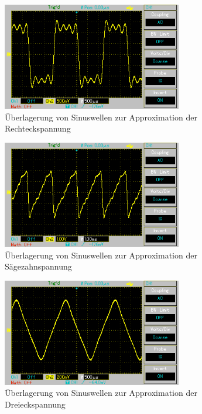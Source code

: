 \begin{figure}[H]
 \includegraphics[width = 0.7\textwidth]{pics/rechteck.png}
 \caption{Überlagerung von Sinuswellen zur Approximation der Rechteckspannung}
 \label{pic_rechteckoszi}
\end{figure}
\begin{figure}[H]
 \includegraphics[width = 0.7\textwidth]{pics/saegezahn.png}
 \caption{Überlagerung von Sinuswellen zur Approximation der Sägezahnspannung}
 \label{pic_saegzahnoszi}
\end{figure}
\begin{figure}[H]
 \includegraphics[width = 0.7\textwidth]{pics/dreieck.png}
 \caption{Überlagerung von Sinuswellen zur Approximation der Dreieckspannung}
 \label{pic_dreieckoszi}
\end{figure}

